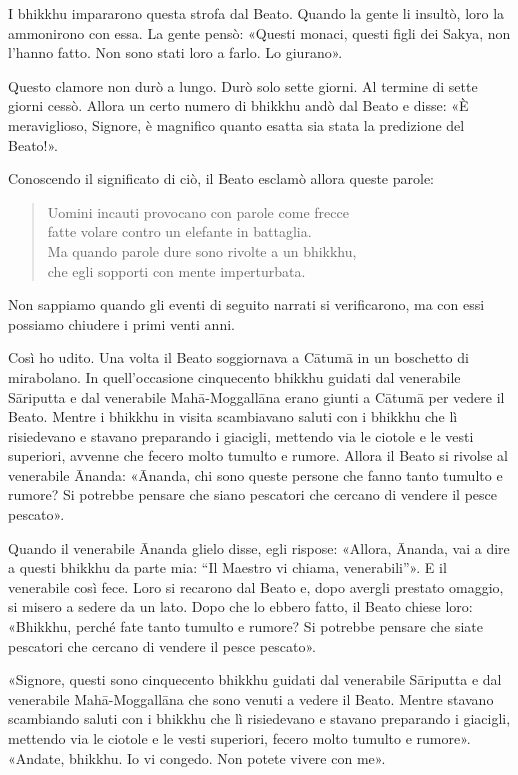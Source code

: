 I bhikkhu impararono questa strofa dal Beato. Quando la gente li insultò, loro
la ammonirono con essa. La gente pensò: «Questi monaci, questi figli dei Sakya,
non l’hanno fatto. Non sono stati loro a farlo. Lo giurano».

Questo clamore non durò a lungo. Durò solo sette giorni. Al termine di sette
giorni cessò. Allora un certo numero di bhikkhu andò dal Beato e disse: «È
meraviglioso, Signore, è magnifico quanto esatta sia stata la predizione del
Beato!».

Conoscendo il significato di ciò, il Beato esclamò allora queste parole:

\begin{quote}
Uomini incauti provocano con parole come frecce \\
fatte volare contro un elefante in battaglia. \\
Ma quando parole dure sono rivolte a un bhikkhu, \\
che egli sopporti con mente imperturbata.
\end{quote}


 Non sappiamo quando gli eventi di seguito narrati si
verificarono, ma con essi possiamo chiudere i primi venti anni.

 Così ho udito. Una volta il Beato soggiornava a Cātumā in un
boschetto di mirabolano. In quell’occasione cinquecento bhikkhu guidati dal
venerabile Sāriputta e dal venerabile Mahā-Moggallāna erano giunti a Cātumā per
vedere il Beato. Mentre i bhikkhu in visita scambiavano saluti con i bhikkhu che
lì risiedevano e stavano preparando i giacigli, mettendo via le ciotole e le
vesti superiori, avvenne che fecero molto tumulto e rumore. Allora il Beato si
rivolse al venerabile Ānanda: «Ānanda, chi sono queste persone che fanno tanto
tumulto e rumore? Si potrebbe pensare che siano pescatori che cercano di vendere
il pesce pescato».

Quando il venerabile Ānanda glielo disse, egli rispose: «Allora, Ānanda, vai a
dire a questi bhikkhu da parte mia: “Il Maestro vi chiama, venerabili”». E il
venerabile così fece. Loro si recarono dal Beato e, dopo avergli prestato
omaggio, si misero a sedere da un lato. Dopo che lo ebbero fatto, il Beato
chiese loro: «Bhikkhu, perché fate tanto tumulto e rumore? Si potrebbe pensare
che siate pescatori che cercano di vendere il pesce pescato».

«Signore, questi sono cinquecento bhikkhu guidati dal venerabile Sāriputta e dal
venerabile Mahā-Moggallāna che sono venuti a vedere il Beato. Mentre stavano
scambiando saluti con i bhikkhu che lì risiedevano e stavano preparando i
giacigli, mettendo via le ciotole e le vesti superiori, fecero molto tumulto e
rumore». «Andate, bhikkhu. Io vi congedo. Non potete vivere con me».

